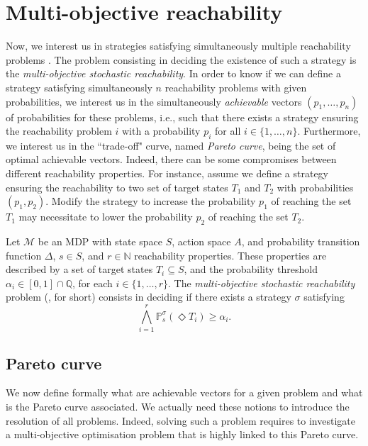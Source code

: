 \section{Multi-objective reachability}
\label{most-section}
Now, we interest us in strategies satisfying simultaneously multiple reachability problems \cite{DBLP:journals/lmcs/EtessamiKVY08}.
The problem consisting in deciding the existence of
such a strategy is the \textit{multi-objective stochastic reachability}.
In order to know if we can define a strategy satisfying simultaneously $n$ reachability problems with given probabilities, we interest us in the simultaneously \textit{achievable} vectors $(p_1, \dots, p_n)$ of probabilities for these problems, i.e., such that there exists a strategy ensuring the reachability problem $i$ with a probability $p_i$ for all $i \in \{1, \dots, n\}$.
Furthermore, we interest us in the ``trade-off" curve, named \textit{Pareto curve}, being the set of optimal achievable vectors.
Indeed, there can be some compromises between different reachability properties. For instance,
assume we define a strategy ensuring the reachability to two set of target states $T_1$ and $T_2$ with probabilities $(p_1, p_2)$.
 Modify the strategy to increase the probability $p_1$ of reaching the set $T_1$ may necessitate to lower the probability $p_2$ of reaching the set $T_2$.

\begin{definition}
  Let $\mathcal{M}$ be an MDP with state space $S$, action space $A$, and probability transition function $\Delta$, $s \in S$, and $r \in \mathbb{N}$ reachability properties.
  These properties are described by a set of target states $T_i \subseteq S$, and the probability threshold $\alpha_i \in [0, 1] \cap \mathbb{Q}$, for each $i \in \{1, \dots, r\}$.
  The \textit{multi-objective stochastic reachability} problem (\MOSR{}, for short) consists in deciding if there exists a strategy $\sigma$ satisfying
  \[
    \bigwedge_{i=1}^r \mathbb{P}^\sigma_s(\Diamond T_i) \geq \alpha_i.
  \]
\end{definition}

\subsection{Pareto curve}
We now define formally what are achievable vectors for a given \MOSR{} problem and what is the Pareto curve associated.
We actually need these notions to introduce the resolution of all \MOSR{} problems.
Indeed, solving such a problem requires to investigate a multi-objective optimisation problem that is highly linked to this Pareto curve.\\

